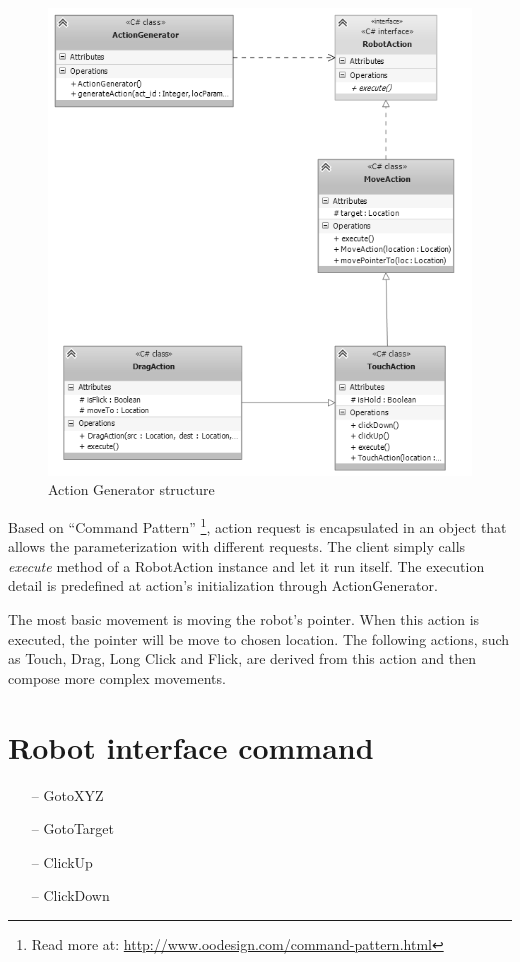 	\begin{figure}[H]
		\centering
		\includegraphics[scale=0.75]{Chapters/Fig/act_gen.png}
		\caption{Action Generator structure}
		\label{fig:act_gen}
	\end{figure}

Based on ``Command Pattern'' \footnote{Read more at: \url{http://www.oodesign.com/command-pattern.html}}, action request is encapsulated in an object that allows the parameterization with different requests. The client simply calls \textit{execute} method of a RobotAction instance and let it run itself. The execution detail is predefined at action's initialization through ActionGenerator.

The most basic movement is moving the robot's pointer. When this action is executed, the pointer will be move to chosen location. The following actions, such as Touch, Drag, Long Click and Flick, are derived from this action and then compose more complex movements.

\section{Robot interface command}

	\begin{itemize}
		\item[--] GotoXYZ
		\item[--] GotoTarget
		\item[--] ClickUp
		\item[--] ClickDown
	\end{itemize}

